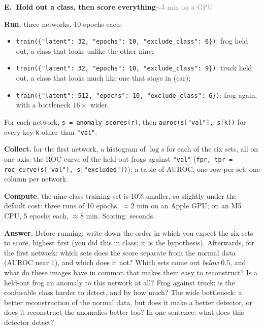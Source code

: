 \documentclass[11pt]{article}
\newcommand{\code}[1]{\texttt{#1}}
\newcounter{exp}
\newenvironment{experiment}[2]{\refstepcounter{exp}\par\medskip
  \textbf{\textcolor{aiblue}{E\theexp.\ #1}}\hfill{\small\textcolor{gray}{#2}}\par}{\par}
\newcommand{\run}[1]{\textbf{Run.} #1\par}
\newcommand{\collect}[1]{\textbf{Collect.} #1\par}
\newcommand{\answer}[1]{\textbf{Answer.} #1\par}
\newcommand{\heavy}[1]{\textcolor{gray!70!black}{\textbf{Compute.} #1}\par}
\begin{document}
\begin{experiment}{Hold out a class, then score everything}{$\sim$3 min on a GPU}
\run{three networks, 10 epochs each:
\begin{itemize}
  \item \code{train(\{"latent": 32, "epochs": 10, "exclude\_class": 6\})}: frog held out, a class that looks unlike the other nine;
  \item \code{train(\{"latent": 32, "epochs": 10, "exclude\_class": 9\})}: truck held out, a class that looks much like one that stays in (car);
  \item \code{train(\{"latent": 512, "epochs": 10, "exclude\_class": 6\})}: frog again, with a bottleneck $16\times$ wider.
\end{itemize}
For each network, \code{s = anomaly\_scores(r)}, then \code{auroc(s["val"], s[k])} for every key \code{k} other than \code{"val"}.}
\collect{for the first network, a histogram of $\log s$ for each of the six sets, all on one axis; the ROC curve of the held-out frogs against \code{"val"} (\code{fpr, tpr = roc\_curve(s["val"], s["excluded"])}); a table of AUROC, one row per set, one column per network.}
\heavy{the nine-class training set is 10\% smaller, so slightly under the default cost: three runs of 10 epochs, $\approx2$ min on an Apple GPU; on an M5 CPU, 5 epochs each, $\approx8$ min. Scoring: seconds.}
\answer{Before running: write down the order in which you expect the six sets to score, highest first (you did this in class; it is the hypothesis). Afterwards, for the first network: which sets does the score separate from the normal data (AUROC near $1$), and which does it not? Which sets come out \emph{below} $0.5$, and what do these images have in common that makes them easy to reconstruct? Is a held-out frog an anomaly to this network at all? Frog against truck: is the confusable class harder to detect, and by how much? The wide bottleneck: a better reconstruction of the normal data, but does it make a better detector, or does it reconstruct the anomalies better too? In one sentence: what does this detector detect?}
\end{experiment}
\end{document}
